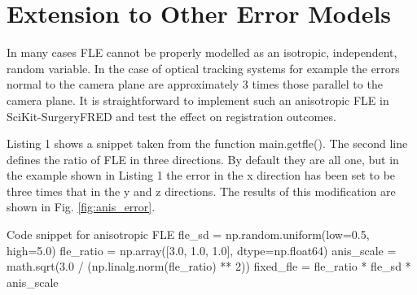 \section{Extension to Other Error Models}
In many cases {FLE} cannot be properly modelled as an isotropic, independent, random variable. In the case of optical tracking systems for example \cite{736031} the errors normal to the camera plane are approximately 3 times those parallel to the camera plane. It is straightforward to implement such an anisotropic \gls{FLE} in SciKit-SurgeryFRED and test the effect on registration outcomes.

Listing 1 shows a snippet taken from the function main.getfle(). The second line defines the ratio of \gls{FLE} in three directions. By default they are all one, but in the example shown in Listing 1 the error in the x direction has been set to be three times that in the y and z directions. The results of this modification are shown in Fig. \ref{fig:anis_error}. 

\begin{pythonlisting}{\label{lis:anis} Code snippet for anisotropic {FLE}}
    fle_sd = np.random.uniform(low=0.5, high=5.0)
    fle_ratio = np.array([3.0, 1.0, 1.0], dtype=np.float64)
    anis_scale = math.sqrt(3.0 / (np.linalg.norm(fle_ratio) ** 2))
    fixed_fle = fle_ratio * fle_sd * anis_scale
\end{pythonlisting}


